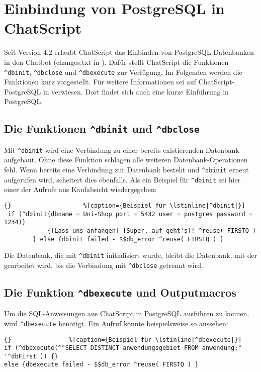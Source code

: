 \section{Einbindung von PostgreSQL in ChatScript}
\label{sec:Einbindung}
Seit Version 4.2 erlaubt ChatScript das Einbinden von PostgreSQL-Datenbanken in den Chatbot (changes.txt in \citet{chatscript2019}). Dafür stellt ChatScript die Funktionen \lstinline|^dbinit|, \lstinline|^dbclose| und \lstinline|^dbexecute| zur Verfügung. Im Folgenden werden die Funktionen kurz vorgestellt. Für weitere Informationen sei auf ChatScript-PostgreSQL in \citet{chatscript2019} verwiesen. Dort findet sich auch eine kurze Einführung in PostgreSQL.


\subsection{Die Funktionen \lstinline|^dbinit| und \lstinline|^dbclose|}
\label{sec:dbinit}
Mit \lstinline|^dbinit| wird eine Verbindung zu einer bereits existierenden Datenbank aufgebaut. Ohne diese Funktion schlagen alle weiteren Datenbank-Operationen fehl. Wenn bereits eine Verbindung zur Datenbank besteht und \lstinline|^dbinit| erneut aufgerufen wird, scheitert dies ebenfalls. Als ein Beispiel für \lstinline|^dbinit| sei hier einer der Aufrufe aus Kaufabsicht wiedergegeben:

\begin{lstlisting}{}					%[caption={Beispiel für \lstinline|^dbinit|}]
 if (^dbinit(dbname = Uni-Shop port = 5432 user = postgres password =  1234))
	        {[Lass uns anfangen] [Super, auf geht's]! ^reuse( FIRSTQ )
	    } else {dbinit failed - $$db_error ^reuse( FIRSTQ ) }
\end{lstlisting}

Die Datenbank, die mit \lstinline|^dbinit| initialisiert wurde, bleibt die Datenbank, mit der gearbeitet wird, bis die Verbindung mit \lstinline|^dbclose| getrennt wird.\\

\subsection{Die Funktion \lstinline|^dbexecute| und Outputmacros}
\label{sec:dbexecute}

Um die SQL-Anweisungen aus ChatScript in  PostgreSQL ausführen zu können, wird \lstinline|^dbexecute| benötigt. Ein Aufruf könnte beispielsweise so aussehen:

\begin{lstlisting}{}				%[caption={Beispiel für \lstinline|^dbexecute|}]
if (^dbexecute(^"SELECT DISTINCT anwendungsgebiet FROM anwendung;" '^dbFirst )) {}
else {dbexecute failed - $$db_error ^reuse( FIRSTQ ) }
\end{lstlisting}

